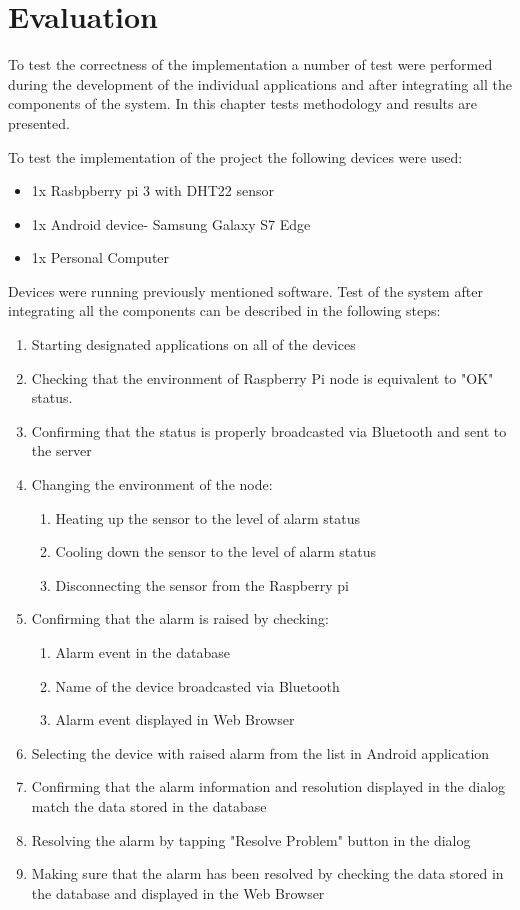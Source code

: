 \chapter{Evaluation}
\label{cha:evaluation}

To test the correctness of the implementation a number of test were performed during the development of the individual applications and after integrating all the components of the system. In this chapter  tests methodology and results are presented.

To test the implementation of the project the following devices were used:

\begin{itemize}
\item 1x Rasbpberry pi 3 with DHT22 sensor 
\item 1x Android device- Samsung Galaxy S7 Edge
\item 1x Personal Computer
\end{itemize}

Devices were running previously mentioned software. Test of the system after integrating all the components can be described in the following steps:

\begin{enumerate}
\item Starting designated applications on all of the devices
\item Checking that the environment of Raspberry Pi node is equivalent to "OK" status.
\item Confirming that the status is properly broadcasted via Bluetooth and sent to the server
\item Changing the environment of the node:
	\begin{enumerate}
	\item Heating up the sensor to the level of alarm status
	\item Cooling down the sensor to the level of alarm status
	\item Disconnecting the sensor from the Raspberry pi
	\end{enumerate}
\item Confirming that the alarm is raised by checking:
 \begin{enumerate}
	\item Alarm event in the database
	\item Name of the device broadcasted via Bluetooth
	\item Alarm event displayed in Web Browser
	\end{enumerate}
\item Selecting the device with raised alarm from the list in Android application  
\item Confirming that the alarm information and resolution displayed in the dialog match the data stored in the database
\item Resolving the alarm by tapping "Resolve Problem" button in the dialog
\item Making sure that the alarm has been resolved by checking the data stored in the database and displayed in the Web Browser
\end{enumerate}

